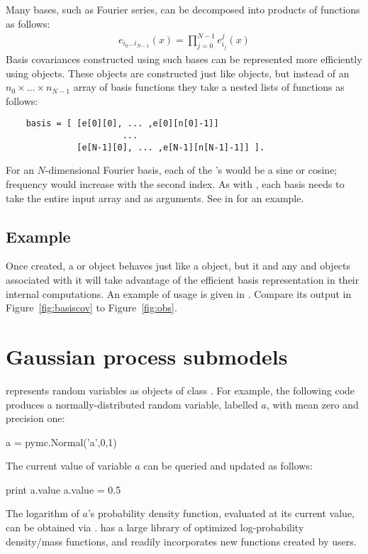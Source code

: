 \documentclass[article]{jss}
\begin{document}
Many bases, such as Fourier series, can be decomposed into products of functions as follows:
\begin{eqnarray*}
    e_{i_0\ldots i_{N-1}}(x) = \prod_{j=0}^{N-1}e_{i_j}^j(x)
\end{eqnarray*}
Basis covariances constructed using such bases can be represented more efficiently using  objects. These objects are constructed just like  objects, but instead of an $n_0\times \ldots \times n_{N-1}$ array of basis functions they take a nested lists of functions as follows:
\begin{verbatim}
    basis = [ [e[0][0], ... ,e[0][n[0]-1]]
                       ...
              [e[N-1][0], ... ,e[N-1][n[N-1]-1]] ].
\end{verbatim}
For an $N$-dimensional Fourier basis, each of the 's would be a sine or cosine; frequency would increase with the second index. As with , each basis needs to take the entire input array  and  as arguments. See  in  for an example.

\subsection{Example}

Once created, a  or  object behaves just like a  object, but it and any  and  objects associated with it will take advantage of the efficient basis representation in their internal computations. An example of  usage is given in . Compare its output in Figure~\ref{fig:basiscov} to Figure~\ref{fig:obs}.


\section{Gaussian process submodels}
\label{sec:gp-sub} 

 \citep{pymc} represents random variables as objects of class . For example, the following code produces a normally-distributed random variable, labelled $a$, with mean zero and precision one:
\begin{CodeChunk}
\begin{CodeInput}
a = pymc.Normal('a',0,1)
\end{CodeInput}
\end{CodeChunk}
The current value of variable $a$ can be queried and updated as follows:
\begin{CodeChunk}
\begin{CodeInput}
print a.value
a.value = 0.5
\end{CodeInput}
\end{CodeChunk}
The logarithm of $a$'s probability density function, evaluated at its current value, can be obtained via .  has a large library of optimized log-probability density/mass functions, and readily incorporates new functions created by users.
\end{document}
